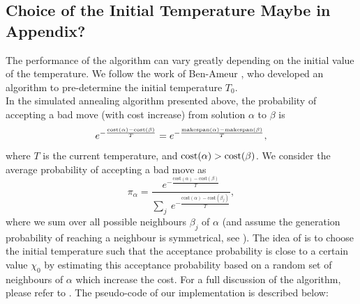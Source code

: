 \documentclass[12pt,a4paper,reqno]{article}
\begin{document}
\subsection{Choice of the Initial Temperature \color{red} Maybe in Appendix? \color{black}}
\label{subsec:initTemp}
The performance of the algorithm can vary greatly depending on the initial value of the temperature. We follow the work of Ben-Ameur \citep{ameur2004}, who developed an algorithm to pre-determine the initial temperature $T_0$. \\

In the simulated annealing algorithm presented above, the probability of accepting a bad move (with cost increase) from solution $\alpha$ to $\beta$ is
\begin{equation}
e^{-\frac{\textnormal{cost}(\alpha)-\textnormal{cost}(\beta)}{T}} = e^{-\frac{\textnormal{makespan}(\alpha)-\text{makespan}(\beta)}{T}},
\end{equation}
where $T$ is the current temperature, and $\textnormal{cost}(\alpha) > \textnormal{cost}(\beta)$.
We consider the average probability of accepting a bad move as
\begin{equation}
\pi_\alpha = \frac{e^{-\frac{\text{cost}(\alpha)-\text{cost}(\beta)}{T}}}{\sum_j  \> e^{-\frac{\text{cost}(\alpha)-\text{cost}(\beta_j)}{T}}},
\end{equation}
where we sum over all possible neighbours $\beta_j$ of $\alpha$ (and assume the generation probability of reaching a neighbour is symmetrical, see \citet{ameur2004}). The idea of \citet{ameur2004} is to choose the initial temperature such that the acceptance probability is close to a certain value $\chi_0$ by estimating this acceptance probability based on a random set of neighbours of $\alpha$ which increase the cost. For a full discussion of the algorithm, please refer to \citet{ameur2004}. The pseudo-code of our implementation is described below: \\
\end{document}
